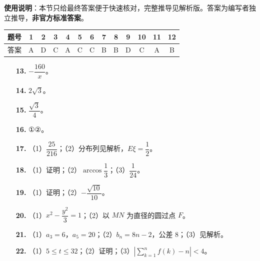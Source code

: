 
\begin{gknotice}
\textbf{使用说明}：本节只给最终答案便于快速核对，完整推导见解析版。答案为编写者独立推导，\textbf{非官方标准答案}。
\end{gknotice}

\begin{center}\begin{tabular}{ccccccccccccc}
\toprule
题号 & 1 & 2 & 3 & 4 & 5 & 6 & 7 & 8 & 9 & 10 & 11 & 12 \\
\midrule
答案 & A & D & C & A & C & C & B & B & D & C & A & B \\
\bottomrule
\end{tabular}\end{center}

\begin{itemize}[leftmargin=2.6em]
  \item[\textbf{13.}] $-\dfrac{160}{x}$。
  \item[\textbf{14.}] $2\sqrt3$。
  \item[\textbf{15.}] $\dfrac{\sqrt3}{4}$。
  \item[\textbf{16.}] ①②。
\end{itemize}

\begin{itemize}[leftmargin=2.6em]
  \item[\textbf{17.}] （1）$\dfrac{25}{216}$；（2）分布列见解析，$E\xi=\dfrac12$。
  \item[\textbf{18.}] （1）证明；（2）$\arccos\dfrac13$；（3）$\dfrac{1}{24}$。
  \item[\textbf{19.}] （1）证明；（2）$-\dfrac{\sqrt{10}}{10}$。
  \item[\textbf{20.}] （1）$x^2-\dfrac{y^2}{3}=1$；（2）以 $MN$ 为直径的圆过点 $F$。
  \item[\textbf{21.}] （1）$a_3=6$，$a_5=20$；（2）$b_n=8n-2$，公差 $8$；（3）见解析。
  \item[\textbf{22.}] （1）$5\leqslant t\leqslant32$；（2）证明；（3）$\left|\sum\limits_{k=1}^nf(k)-n\right|<4$。
\end{itemize}
